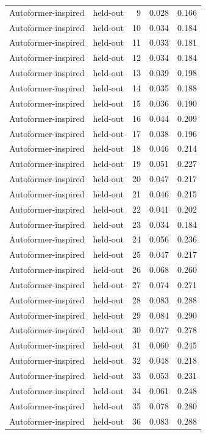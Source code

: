 \begin{tabular}{llrrr}
Autoformer-inspired & held-out & 9 & 0.028 & 0.166 \\
Autoformer-inspired & held-out & 10 & 0.034 & 0.184 \\
Autoformer-inspired & held-out & 11 & 0.033 & 0.181 \\
Autoformer-inspired & held-out & 12 & 0.034 & 0.184 \\
Autoformer-inspired & held-out & 13 & 0.039 & 0.198 \\
Autoformer-inspired & held-out & 14 & 0.035 & 0.188 \\
Autoformer-inspired & held-out & 15 & 0.036 & 0.190 \\
Autoformer-inspired & held-out & 16 & 0.044 & 0.209 \\
Autoformer-inspired & held-out & 17 & 0.038 & 0.196 \\
Autoformer-inspired & held-out & 18 & 0.046 & 0.214 \\
Autoformer-inspired & held-out & 19 & 0.051 & 0.227 \\
Autoformer-inspired & held-out & 20 & 0.047 & 0.217 \\
Autoformer-inspired & held-out & 21 & 0.046 & 0.215 \\
Autoformer-inspired & held-out & 22 & 0.041 & 0.202 \\
Autoformer-inspired & held-out & 23 & 0.034 & 0.184 \\
Autoformer-inspired & held-out & 24 & 0.056 & 0.236 \\
Autoformer-inspired & held-out & 25 & 0.047 & 0.217 \\
Autoformer-inspired & held-out & 26 & 0.068 & 0.260 \\
Autoformer-inspired & held-out & 27 & 0.074 & 0.271 \\
Autoformer-inspired & held-out & 28 & 0.083 & 0.288 \\
Autoformer-inspired & held-out & 29 & 0.084 & 0.290 \\
Autoformer-inspired & held-out & 30 & 0.077 & 0.278 \\
Autoformer-inspired & held-out & 31 & 0.060 & 0.245 \\
Autoformer-inspired & held-out & 32 & 0.048 & 0.218 \\
Autoformer-inspired & held-out & 33 & 0.053 & 0.231 \\
Autoformer-inspired & held-out & 34 & 0.061 & 0.248 \\
Autoformer-inspired & held-out & 35 & 0.078 & 0.280 \\
Autoformer-inspired & held-out & 36 & 0.083 & 0.288 \\

\end{tabular}
